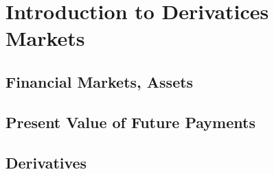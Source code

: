 \documentclass[11pt,fleqn]{book} %
\begin{document}


\pagestyle{empty} %

\tableofcontents %

\cleardoublepage %

\pagestyle{fancy} %





\chapter{Introduction to Derivatices Markets}

\section{Financial Markets, Assets}


\section{Present Value of Future Payments}


\section{Derivatives}
\end{document}
